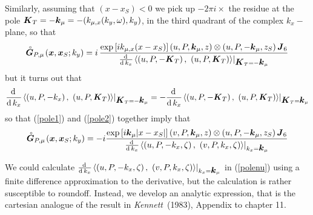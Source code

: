 Similarly, assuming that $(x-x_S)<0$ we pick up $- 2 \pi i \times $ the 
residue  at the  pole  ${\mbox{\boldmath$\mit K$\unboldmath}}_{T}= - {\mbox{\boldmath$\mit k$\unboldmath}}_{\mu}=-(k_{\mu, x}(k_{ y},\omega), k_{ y})$, in the
third quadrant of the complex $k_x-$plane, so that
\begin{equation}	\label{pole2}
	\stackrel{\scriptscriptstyle _{\,\,\circ}}{ \mbox{\boldmath$\mit G$\unboldmath}}_{P,\mu}\!({\mbox{\boldmath$\mit x$\unboldmath}},{\mbox{\boldmath$\mit x$\unboldmath}}_{S};k_{y})=
	i\,
	\frac{ \exp \left[{i{k}_{ \mu,x }({x-{x}_{S}})}\right] \left({ u,P,{\mbox{\boldmath$\mit k$\unboldmath}}_{ \mu 
	},z}\right)\otimes \left({ u,P,-{\mbox{\boldmath$\mit k$\unboldmath}}_{ \mu },z_S}\right){ \mbox{\boldmath$\mit J$\unboldmath}}_{6}}{ 
	{\frac{{\rm d}\,}{ {\rm d}\,{ k}_{x}}} {\left.{\left\langle{\left({ 
	u,P,-{\mbox{\boldmath$\mit K$\unboldmath}}_{T }}\right) ,\ \left({u,P,{\mbox{\boldmath$\mit K$\unboldmath}}_{T 
	}}\right)}\right\rangle}\right|}_{{\mbox{\boldmath$\mit K$\unboldmath}}_{T} =-{\mbox{\boldmath$\mit k$\unboldmath}}_{ \mu }}}  
\end{equation}
but it turns out that 
\[
{\frac{{\rm d}\,}{ {\rm d}\,{ k}_{x}}}{\left.\left\langle\left( 
	u,P,-{k}_{ x }\right) ,\ \left(u,P,{\mbox{\boldmath$\mit K$\unboldmath}}_{T} 
	\right)\right\rangle\right|}_{{\mbox{\boldmath$\mit K$\unboldmath}}_{T} =-{\mbox{\boldmath$\mit k$\unboldmath}}_{ \mu }} = - 
{\frac{{\rm d}\,}{ {\rm d}\,{ k}_{x}}}{\left.\left\langle\left( 
	u,P,-{\mbox{\boldmath$\mit K$\unboldmath}}_{T}\right) ,\ \left(u,P,{\mbox{\boldmath$\mit K$\unboldmath}}_{T}\right)
	\right\rangle\right|}_{{\mbox{\boldmath$\mit K$\unboldmath}}_{T} ={\mbox{\boldmath$\mit k$\unboldmath}}_{ \mu }}
\]
so that  (\ref{pole1}) and (\ref{pole2}) together imply that
\begin{equation} 	\label{polenu}
	\stackrel{\scriptscriptstyle _{\,\,\circ}}{ \mbox{\boldmath$\mit G$\unboldmath}}_{P,\mu}\!({\mbox{\boldmath$\mit x$\unboldmath}},{\mbox{\boldmath$\mit x$\unboldmath}}_{S};k_{y})=-i {\frac{
	\exp\left[{i{\mbox{\boldmath$\mit k$\unboldmath}}_{ \mu }|{x-{x}_{S}}|}\right] \left({ v,P,{\mbox{\boldmath$\mit k$\unboldmath}}_{ \mu 
	},z}\right)\otimes \left({ u,P,-{\mbox{\boldmath$\mit k$\unboldmath}}_{ \mu },z_S}\right){ \mbox{\boldmath$\mit J$\unboldmath}}_{6}}{ 
	{\frac{{\rm d}\,}{ {\rm d}\,{ k}_{x}}} {\left.{\left\langle{\left({ 
	u,P,-{k}_{ x },\zeta}\right) ,\ \left({v,P,{k}_{ x 
	},\zeta}\right)}\right\rangle}\right|}_{{ k}_{ x} ={\mbox{\boldmath$\mit k$\unboldmath}}_{ \mu }}}}  
\end{equation}

We could calculate 
${\frac{{\rm d}\,}{ {\rm d}\,{ k}_{x}}}{\left.\left\langle\left( 
	u,P,-{k}_{ x },\zeta\right) ,\ \left(v,P,{k}_{ x 
	},\zeta\right)\right\rangle\right|}_{{ k}_{ x} ={\mbox{\boldmath$\mit k$\unboldmath}}_{ \mu }}$ 
in (\ref{polenu}) using a finite difference approximation to the 
derivative, but the calculation is rather susceptible to roundoff. 
Instead, we develop an analytic expression, that is 
the cartesian  analogue  of the result in {\em 
Kennett\/}~(1983),  Appendix to chapter 11.

